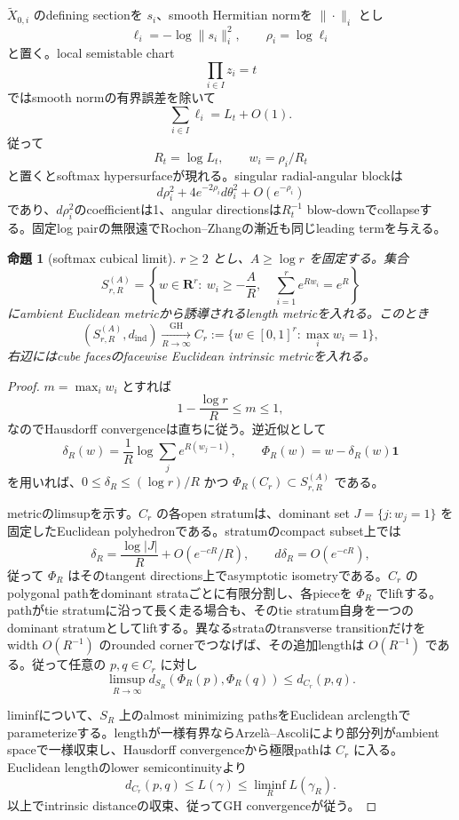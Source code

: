 \documentclass[11pt,a4paper]{ltjsarticle}
\newtheorem{proposition}[theorem]{命題}
\theoremstyle{definition}
\theoremstyle{remark}
\newcommand{\RR}{\mathbf R}
\newcommand{\GH}{\mathrm{GH}}
\begin{document}
$\widetilde X_{0,i}$ のdefining sectionを $s_i$、smooth Hermitian normを $\|\cdot\|_i$ とし
\[
 \ell_i=-\log\|s_i\|_i^2,\qquad
 \rho_i=\log\ell_i
\]
と置く。local semistable chart
\begin{equation}\label{eq:toroidal-product}
 \prod_{i\in I}z_i=t
\end{equation}
ではsmooth normの有界誤差を除いて
\begin{equation}\label{eq:ell-sum}
 \sum_{i\in I}\ell_i=L_t+O(1).
\end{equation}
従って
\[
 R_t=\log L_t,\qquad w_i=\rho_i/R_t
\]
と置くとsoftmax hypersurfaceが現れる。singular radial-angular blockは
\begin{equation}\label{eq:poincare-radial}
 d\rho_i^2+4e^{-2\rho_i}d\theta_i^2+O(e^{-\rho_i})
\end{equation}
であり、$d\rho_i^2$のcoefficientは1、angular directionsは$R_t^{-1}$ blow-downでcollapseする。固定log pairの無限遠でRochon--Zhangの漸近も同じleading termを与える\cite{RochonZhang}。

\begin{proposition}[softmax cubical limit]\label{prop:softmax}
$r\ge2$ とし、$A\ge\log r$ を固定する。集合
\[
 S^{(A)}_{r,R}=\left\{w\in\RR^r:\ w_i\ge-\frac AR,\quad
              \sum_{i=1}^r e^{Rw_i}=e^R\right\}
\]
にambient Euclidean metricから誘導されるlength metricを入れる。このとき
\begin{equation}\label{eq:softmaxGH}
 (S^{(A)}_{r,R},d_{\mathrm{ind}})\xrightarrow[R\to\infty]{\GH}
 C_r:=\{w\in[0,1]^r:\max_iw_i=1\},
\end{equation}
右辺にはcube facesのfacewise Euclidean intrinsic metricを入れる。
\end{proposition}

\begin{proof}
$m=\max_iw_i$ とすれば
\[
 1-\frac{\log r}{R}\le m\le1,
\]
なのでHausdorff convergenceは直ちに従う。逆近似として
\[
 \delta_R(w)=\frac1R\log\sum_j e^{R(w_j-1)},
 \qquad \Phi_R(w)=w-\delta_R(w)\mathbf1
\]
を用いれば、$0\le\delta_R\le(\log r)/R$ かつ $\Phi_R(C_r)\subset S^{(A)}_{r,R}$ である。

metricのlimsupを示す。$C_r$ の各open stratumは、dominant set
$J=\{j:w_j=1\}$ を固定したEuclidean polyhedronである。stratumのcompact subset上では
\[
 \delta_R=\frac{\log|J|}{R}+O(e^{-cR}/R),
 \qquad d\delta_R=O(e^{-cR}),
\]
従って $\Phi_R$ はそのtangent directions上でasymptotic isometryである。$C_r$ のpolygonal pathをdominant strataごとに有限分割し、各pieceを $\Phi_R$ でliftする。pathがtie stratumに沿って長く走る場合も、そのtie stratum自身を一つのdominant stratumとしてliftする。異なるstrataのtransverse transitionだけをwidth $O(R^{-1})$ のrounded cornerでつなげば、その追加lengthは $O(R^{-1})$ である。従って任意の $p,q\in C_r$ に対し
\[
 \limsup_{R\to\infty}d_{S_R}(\Phi_R(p),\Phi_R(q))\le d_{C_r}(p,q).
\]

liminfについて、$S_R$ 上のalmost minimizing pathsをEuclidean arclengthでparameterizeする。lengthが一様有界ならArzelà--Ascoliにより部分列がambient spaceで一様収束し、Hausdorff convergenceから極限pathは $C_r$ に入る。Euclidean lengthのlower semicontinuityより
\[
 d_{C_r}(p,q)\le L(\gamma)\le\liminf_R L(\gamma_R).
\]
以上でintrinsic distanceの収束、従ってGH convergenceが従う。
\end{proof}
\end{document}
